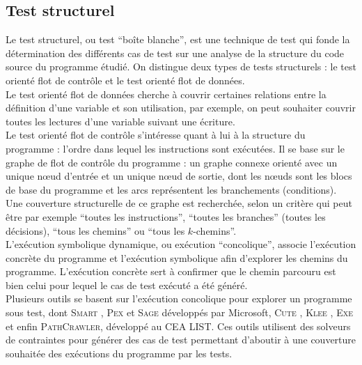 \subsection{Test structurel}
\label{sec:test-structurel}

Le test structurel, ou test ``boîte blanche'', est une technique de test qui
fonde la détermination des différents cas de test sur une analyse de la
structure du code source du programme étudié. On distingue deux types de tests
structurels : le test orienté flot de contrôle et le test orienté flot de
données.\\

Le test orienté flot de données cherche à couvrir certaines relations entre la
définition d’une variable et son utilisation, par exemple, on peut souhaiter
couvrir toutes les lectures d'une variable suivant une écriture.\\

Le test orienté flot de contrôle s’intéresse quant à lui à la structure du
programme : l'ordre dans lequel les instructions sont exécutées. Il se base sur
le graphe de flot de contrôle du programme : un graphe connexe orienté avec un
unique n\oe{}ud d’entrée et un unique n\oe{}ud de sortie, dont les n\oe{}uds
sont les blocs de base du programme et les arcs représentent les branchements
(conditions). Une couverture structurelle de ce graphe est recherchée, selon un
critère qui peut être par exemple ``toutes les instructions'',
``toutes les branches'' (toutes les décisions), ``tous les chemins'' ou
``tous les $k$-chemins''.\\

L’exécution symbolique dynamique, ou exécution ``concolique'', associe
l’exécution concrète du programme et l’exécution symbolique afin d’explorer les
chemins du programme. L’exécution concrète sert à confirmer que le chemin
parcouru est bien celui pour lequel le cas de test exécuté a été généré.\\

Plusieurs outils se basent sur l'exécution concolique pour explorer un programme
sous test, dont \textsc{Smart} \cite{SMART}, \textsc{Pex} \cite{Pex} et
\textsc{Sage} \cite{Sage} développés par Microsoft, \textsc{Cute} \cite{CUTE},
\textsc{Klee} \cite{KLEE}, \textsc{Exe} \cite{EXE} et enfin
\textsc{PathCrawler}, \cite{PathCrawler} développé au CEA LIST. Ces outils
utilisent des solveurs de contraintes pour générer des cas de test permettant
d'aboutir à une couverture souhaitée des exécutions du programme par les tests.


